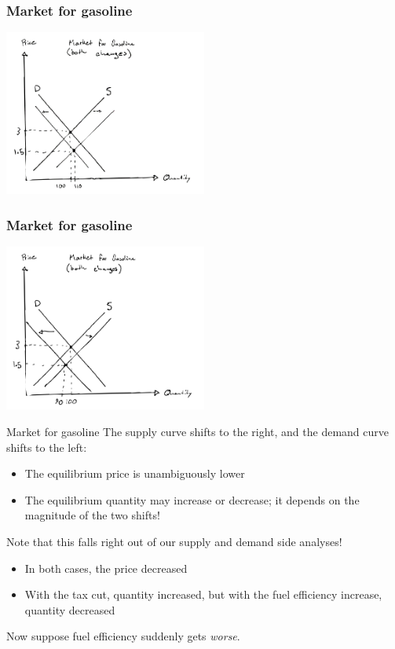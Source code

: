 \documentclass[aspectratio=169]{beamer}
\begin{document}
\begin{frame}
    \frametitle{Market for gasoline}
    \centering
    \includegraphics[width = 0.5\textwidth,keepaspectratio]{both_changes_1a.png}
\end{frame}

\begin{frame}
    \frametitle{Market for gasoline}
    \centering
    \includegraphics[width = 0.5\textwidth,keepaspectratio]{both_changes_1b.png}
\end{frame}

\begin{frame}{Market for gasoline}
    The supply curve shifts to the right, and the demand curve shifts to the left:
    \begin{itemize}
        \item The equilibrium price is unambiguously lower
        \item The equilibrium quantity may increase or decrease; it depends on the magnitude of the two shifts!
    \end{itemize}

    Note that this falls right out of our supply and demand side analyses!
    \begin{itemize}
        \item In both cases, the price decreased
        \item With the tax cut, quantity increased, but with the fuel efficiency increase, quantity decreased
    \end{itemize}

    Now suppose fuel efficiency suddenly gets \textit{worse}.

\end{frame}
\end{document}
